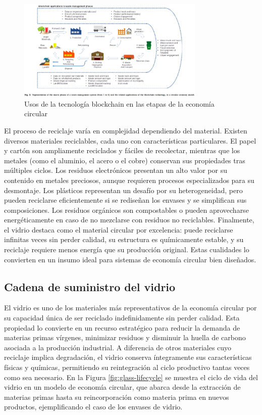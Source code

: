 \begin{figure}[!htpb]
    \centering
    \includegraphics[width=0.8\textwidth]{Figures/baralla-model-1.png}
    \caption{Usos de la tecnología blockchain en las etapas de la economía circular \cite{baralla2023waste}}
    \label{fig:baralla-model-1}
\end{figure}

El proceso de reciclaje varía en complejidad dependiendo del material. Existen diversos materiales reciclables, cada uno con características particulares. El papel y cartón son ampliamente reciclados y fáciles de recolectar, mientras que los metales (como el aluminio, el acero o el cobre) conservan sus propiedades tras múltiples ciclos. Los residuos electrónicos presentan un alto valor por su contenido en metales preciosos, aunque requieren procesos especializados para su desmontaje. Los plásticos representan un desafío por su heterogeneidad, pero pueden reciclarse eficientemente si se rediseñan los envases y se simplifican sus composiciones. Los residuos orgánicos son compostables o pueden aprovecharse energéticamente en caso de no mezclarse con residuos no reciclables. Finalmente, el vidrio destaca como el material circular por excelencia: puede reciclarse infinitas veces sin perder calidad, su estructura es químicamente estable, y su reciclaje requiere menos energía que su producción original. Estas cualidades lo convierten en un insumo ideal para sistemas de economía circular bien diseñados.

\subsection{Cadena de suministro del vidrio}

El vidrio es uno de los materiales más representativos de la economía circular por su capacidad única de ser reciclado indefinidamente sin perder calidad. Esta propiedad lo convierte en un recurso estratégico para reducir la demanda de materias primas vírgenes, minimizar residuos y disminuir la huella de carbono asociada a la producción industrial. A diferencia de otros materiales cuyo reciclaje implica degradación, el vidrio conserva íntegramente sus características físicas y químicas, permitiendo su reintegración al ciclo productivo tantas veces como sea necesario. En la Figura \ref{fig:glass-lifecycle} se muestra el ciclo de vida del vidrio en un modelo de economía circular, que abarca desde la extracción de materias primas hasta su reincorporación como materia prima en nuevos productos, ejemplificando el caso de los envases de vidrio.

